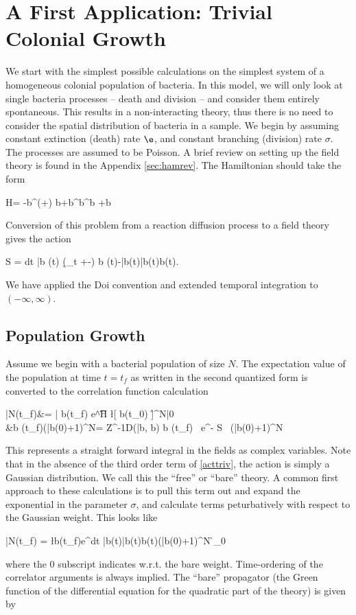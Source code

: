 \documentclass[aps,prx,groupedaddress,notitlepage]{revtex4-1} %
\newcommand{\tr}{{\!\+{tr}}}
\begin{document}
\section{A First Application: Trivial Colonial Growth}

We start with the simplest possible calculations on the simplest system of a homogeneous colonial population of bacteria. In this model, we will only look at single bacteria processes -- death and division -- and consider them entirely spontaneous. This results in a non-interacting theory, thus there is no need to consider the spatial distribution of bacteria in a sample. We begin by assuming constant extinction (death) rate $\e$, and constant branching (division) rate $\sigma$. The processes are assumed to be Poisson. A brief review on setting up the field theory is found in the Appendix \ref{sec:hamrev}. The Hamiltonian should take the form
		\begin{align**}
		H= -b^\dag  (\e+\sigma) b+\sigma b^\dag b^\dag b +\e b 
		\end{align**}
Conversion of this problem from a reaction diffusion process to a field theory gives the action
	\begin{align**}\label{acttriv}
		\?S = \int dt  \; \bar b (t) (\d_t +\e-\sigma) b (t)-\sigma\bar  b(t)\bar b(t)b(t).
	\end{align**}
We have applied the Doi convention and extended temporal integration to $(-\infty, \infty)$.


\subsection{Population Growth}
 Assume we begin with a bacterial population of size $N$. The expectation value of the population at time $t=t_f$ as written in the second quantized form is converted to the correlation function calculation
	\begin{align**}
		\bar N(t_f)&= \langle \tr| b(t_f) e^{\t \hat H} \l[ b\dg(t_0) \r]^N|0\rangle	\\
		&\langle b (t_f)(\bar b(0)+1)^{N}\rangle = \?Z^{-1}\int \?D(\bar b, b) \;   b (t_f) \, e^{-\? S} \, (\bar b(0)+1)^{N}
	\end{align**}
This represents a straight forward integral in the fields as complex variables. Note that in the absence of the third order term of \ref{acttriv}, the action is simply a Gaussian distribution. We call this the ``free'' or ``bare'' theory. A common first approach to these calculations is to pull this term out and expand the exponential in the parameter $\sigma$, and calculate terms peturbatively with respect to the Gaussian weight. This looks like  
	\begin{align**}
	 	\bar N(t_f) = \l \langle b(t_f)\;e^{\sigma \int  dt  \bar  b(t)\bar b(t)b(t)}\;(\bar b(0)+1)^{N} \r\rangle_0
	\end{align**}
where the $0$ subscript indicates w.r.t. the bare weight. Time-ordering of the correlator arguments is always implied. The ``bare'' propagator (the Green function of the differential equation for the quadratic part of the theory) is given by
\end{document}
